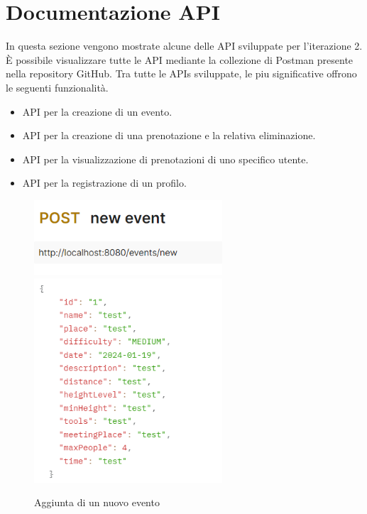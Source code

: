 \section{Documentazione API}
In questa sezione vengono mostrate alcune delle API sviluppate per l’iterazione 2. 
È possibile visualizzare tutte le API mediante la collezione di Postman presente nella repository GitHub.
Tra tutte le APIs sviluppate, le piu significative offrono le seguenti funzionalità.
\begin{itemize}
    \item API per la creazione di un evento.
    \item API per la creazione di una prenotazione e la relativa eliminazione.
    \item API per la visualizzazione di prenotazioni di uno specifico utente.
    \item API per la registrazione di un profilo.
\end{itemize}


\newpage

\begin{figure}[h!]
\includegraphics[width=7cm]{test/postman/tnewevent.PNG}\\
\includegraphics[width=7cm]{test/postman/newevent.PNG}\\
\caption{Aggiunta di un nuovo evento}
\end{figure}

